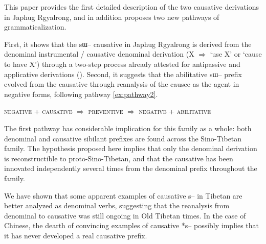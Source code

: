 \documentclass[oldfontcommands,oneside,a4paper,11pt]{article}
\newcommand{\ipa}[1]{{\phon \mbox{#1}}} %
\begin{document}
This paper   provides the first detailed description of the two causative derivations in Japhug Rgyalrong, and in addition  proposes two new pathways of grammaticalization.

 First, it shows that the \ipa{sɯ--} causative in Japhug Rgyalrong is derived from the denominal instrumental  / causative denominal derivation (X $\Rightarrow$ `use X' or `cause to have X') through a two-step process already attested for antipassive and applicative derivations (\citealt{jacques14antipassive}). Second, it   suggests that the abilitative \ipa{sɯ--} prefix evolved from the causative through reanalysis of the causee as the agent in negative forms, following pathway \ref{ex:pathway2}.
 
{\small
\begin{exe}
\ex \label{ex:pathway2}
\glt \textsc{negative}   + \textsc{causative} $\Rightarrow$ \textsc{preventive} $\Rightarrow$ \textsc{negative} +  \textsc{abilitative} 
\end{exe}
}

The first pathway has considerable implication for this family as a whole: both denominal and causative sibilant prefixes are found across the Sino-Tibetan family. The hypothesis proposed here implies that only the denominal derivation is reconstructible to proto-Sino-Tibetan, and that the causative has been innovated independently several times from the denominal prefix throughout the family. 

We have shown that  some apparent examples of causative \ipa{s--} in Tibetan are better analyzed as denominal verbs, suggesting that the reanalysis from denominal to causative was still ongoing in Old Tibetan times. In the case of Chinese, the dearth of convincing examples of causative *\ipa{s--} possibly implies that it has never developed a real causative prefix.



\end{document}
